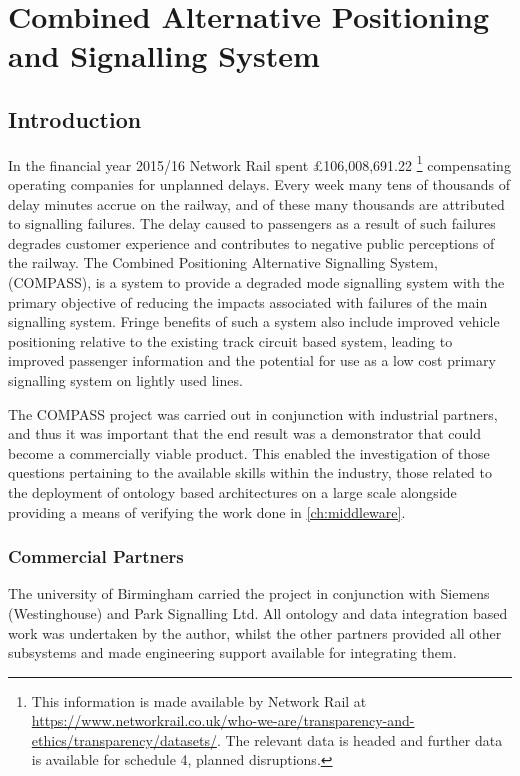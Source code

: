 \chapter{Combined Alternative Positioning and Signalling System}\label{ch:COMPASS}
\section{Introduction}
In the financial year 2015/16 Network Rail spent £106,008,691.22 \footnote{This information is made available by Network Rail at \url{https://www.networkrail.co.uk/who-we-are/transparency-and-ethics/transparency/datasets/}. The relevant data is headed  and further data is available for schedule 4, planned disruptions.} compensating operating companies for unplanned delays. Every week many tens of thousands of delay minutes accrue on the railway, and of these many thousands are attributed to signalling failures. The delay caused to passengers as a result of such failures degrades customer experience and contributes to negative public perceptions of the railway. The Combined Positioning Alternative Signalling System,(COMPASS), is a system to provide a degraded mode signalling system with the primary objective of reducing the impacts associated with failures of the main signalling system. Fringe benefits of such a system also include improved vehicle positioning relative to the existing track circuit based system, leading to improved passenger information and the potential for use as a low cost primary signalling system on lightly used lines. 

The COMPASS project was carried out in conjunction with industrial partners, and thus it was important that the end result was a demonstrator that could become a commercially viable product. This enabled the investigation of those questions pertaining to the available skills within the industry, those related to the deployment of ontology based architectures on a large scale alongside providing a means of verifying the work done in \autoref{ch:middleware}.


\subsection{Commercial Partners}
The university of Birmingham carried the project in conjunction with Siemens (Westinghouse) and Park Signalling Ltd. All ontology and data integration based work was undertaken by the author, whilst the other partners provided all other subsystems and made engineering support available for integrating them.


